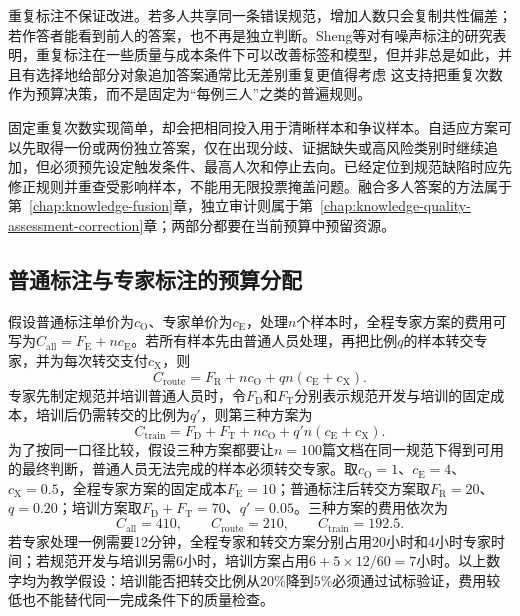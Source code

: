 \Needspace{65mm}
重复标注不保证改进。若多人共享同一条错误规范，增加人数只会复制共性偏差；若作答者能看到前人的答案，也不再是独立判断。Sheng等对有噪声标注的研究表明，重复标注在一些质量与成本条件下可以改善标签和模型，但并非总是如此，并且有选择地给部分对象追加答案通常比无差别重复更值得考虑
这支持把重复次数作为预算决策，而不是固定为“每例三人”之类的普遍规则。

固定重复次数实现简单，却会把相同投入用于清晰样本和争议样本。自适应方案可以先取得一份或两份独立答案，仅在出现分歧、证据缺失或高风险类别时继续追加，但必须预先设定触发条件、最高人次和停止去向。已经定位到规范缺陷时应先修正规则并重查受影响样本，不能用无限投票掩盖问题。融合多人答案的方法属于第~\ref{chap:knowledge-fusion}章，独立审计则属于第~\ref{chap:knowledge-quality-assessment-correction}章；两部分都要在当前预算中预留资源。

\subsection{普通标注与专家标注的预算分配}
\label{sec:knowledge-acquisition-human-generalist-versus-expert}

假设普通标注单价为$c_{\mathrm{O}}$、专家单价为$c_{\mathrm{E}}$，处理$n$个样本时，全程专家方案的费用可写为$C_{\mathrm{all}}=F_{\mathrm{E}}+nc_{\mathrm{E}}$。若所有样本先由普通人员处理，再把比例$q$的样本转交专家，并为每次转交支付$c_{\mathrm{X}}$，则
\begin{equation}
  C_{\mathrm{route}}
  =F_{\mathrm{R}}+nc_{\mathrm{O}}
   +qn(c_{\mathrm{E}}+c_{\mathrm{X}}).
  \label{eq:knowledge-acquisition-human-expert-routing-cost}
\end{equation}
专家先制定规范并培训普通人员时，令$F_{\mathrm{D}}$和$F_{\mathrm{T}}$分别表示规范开发与培训的固定成本，培训后仍需转交的比例为$q'$，则第三种方案为
\begin{equation}
  C_{\mathrm{train}}
  =F_{\mathrm{D}}+F_{\mathrm{T}}+nc_{\mathrm{O}}
   +q'n(c_{\mathrm{E}}+c_{\mathrm{X}}).
  \label{eq:knowledge-acquisition-human-expert-training-cost}
\end{equation}
为了按同一口径比较，假设三种方案都要让$n=100$篇文档在同一规范下得到可用的最终判断，普通人员无法完成的样本必须转交专家。取$c_{\mathrm{O}}=1$、$c_{\mathrm{E}}=4$、$c_{\mathrm{X}}=0.5$，全程专家方案的固定成本$F_{\mathrm{E}}=10$；普通标注后转交方案取$F_{\mathrm{R}}=20$、$q=0.20$；培训方案取$F_{\mathrm{D}}+F_{\mathrm{T}}=70$、$q'=0.05$。三种方案的费用依次为
\[
  C_{\mathrm{all}}=410,\qquad
  C_{\mathrm{route}}=210,\qquad
  C_{\mathrm{train}}=192.5.
\]
若专家处理一例需要12分钟，全程专家和转交方案分别占用20小时和4小时专家时间；若规范开发与培训另需6小时，培训方案占用$6+5\times12/60=7$小时。以上数字均为教学假设：培训能否把转交比例从$20\%$降到$5\%$必须通过试标验证，费用较低也不能替代同一完成条件下的质量检查。

